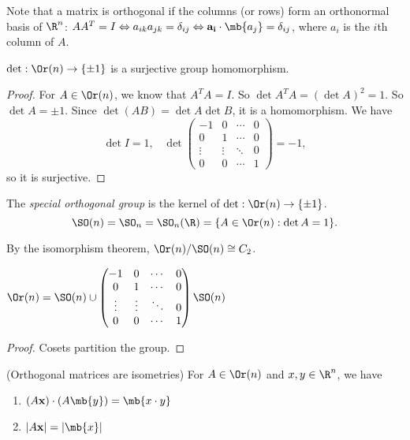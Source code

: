 \documentclass[a4paper]{article}
\begin{document}
  Note that a matrix is orthogonal if the columns (or rows) form an orthonormal basis of $\R^n$: $AA^T = I\Leftrightarrow a_{ik}a_{jk} = \delta_{ij} \Leftrightarrow \mathbf{a_i}\cdot \mb{a_j} = \delta_{ij}$, where $a_i$ is the $i$th column of $A$.

  \begin{prop}
    $\det: \Or(n) \to \{\pm 1\}$ is a surjective group homomorphism. 
  \end{prop}

  \begin{proof}
    For $A\in \Or(n)$, we know that $A^TA = I$. So $\det A^TA = (\det A)^2  = 1$. So $\det A = \pm 1$. Since $\det(AB) = \det A\det B$, it is a homomorphism. We have
    \[
      \det I = 1,\;\;\;\det 
      \begin{pmatrix}
        -1 & 0 &\cdots & 0\\
        0 & 1 & \cdots & 0\\
        \vdots & \vdots & \ddots & 0\\
        0 & 0 & \cdots & 1
      \end{pmatrix} = -1,
    \]
    so it is surjective.
  \end{proof}

  \begin{defi}
    The \emph{special orthogonal group} is the kernel of $\det: \Or(n) \to \{\pm 1\}$.
    \[
      \SO(n) =\SO_n = \SO_n(\R) = \{A\in \Or(n): \det A = 1\}.
    \]
  \end{defi}
  By the isomorphism theorem, $\Or(n)/\SO(n) \cong C_2$.

  \begin{lemma}
    $\Or(n) = \SO(n) \cup
    \begin{pmatrix}
      -1 & 0 &\cdots & 0\\
      0 & 1 & \cdots & 0\\
      \vdots & \vdots & \ddots & 0\\
      0 & 0 & \cdots &1
    \end{pmatrix}\SO(n)$
  \end{lemma}

  \begin{proof}
    Cosets partition the group.
  \end{proof}

  \begin{lemma}
    (Orthogonal matrices are isometries) For $A\in \Or(n)$ and $x, y\in \R^n$, we have
    \begin{enumerate}
      \item $(A\mathbf{x})\cdot (A\mb{y}) = \mb{x\cdot y}$
      \item $|A\mathbf{x}| = |\mb{x}|$
    \end{enumerate}
  \end{lemma}
\end{document}
